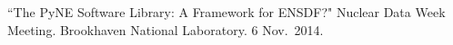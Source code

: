 \begin{bibsection}










\item ``The PyNE Software Library: A Framework for ENSDF?" Nuclear Data Week Meeting. Brookhaven National Laboratory. 6 Nov.\ 2014. 


\end{bibsection}
